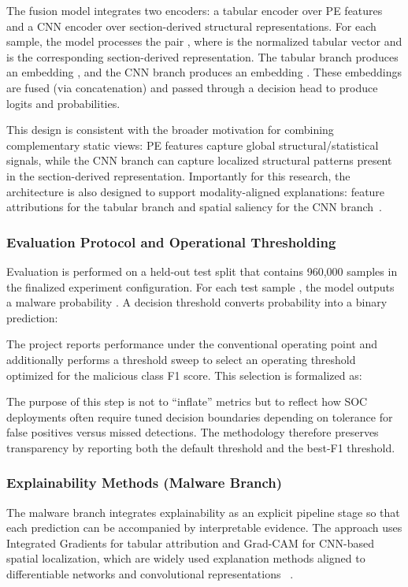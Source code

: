 \documentclass[conference]{IEEEtran}
\begin{document}
The fusion model integrates two encoders: a tabular encoder over PE features and a CNN encoder over section-derived structural representations. For each sample, the model processes the pair , where is the normalized tabular vector and is the corresponding section-derived representation. The tabular branch produces an embedding , and the CNN branch produces an embedding . These embeddings are fused (via concatenation) and passed through a decision head to produce logits and probabilities.

This design is consistent with the broader motivation for combining complementary static views: PE features capture global structural/statistical signals, while the CNN branch can capture localized structural patterns present in the section-derived representation. Importantly for this research, the architecture is also designed to support modality-aligned explanations: feature attributions for the tabular branch and spatial saliency for the CNN branch~\cite{SCDVPB2017}\cite{MAQ2017}.

\subsubsection{Evaluation Protocol and Operational Thresholding}

Evaluation is performed on a held-out test split that contains 960,000 samples in the finalized experiment configuration. For each test sample , the model outputs a malware probability . A decision threshold converts probability into a binary prediction:

The project reports performance under the conventional operating point and additionally performs a threshold sweep to select an operating threshold optimized for the malicious class F1 score. This selection is formalized as:

The purpose of this step is not to “inflate” metrics but to reflect how SOC deployments often require tuned decision boundaries depending on tolerance for false positives versus missed detections. The methodology therefore preserves transparency by reporting both the default threshold and the best-F1 threshold.

\subsubsection{Explainability Methods (Malware Branch)}

The malware branch integrates explainability as an explicit pipeline stage so that each prediction can be accompanied by interpretable evidence. The approach uses Integrated Gradients for tabular attribution and Grad-CAM for CNN-based spatial localization, which are widely used explanation methods aligned to differentiable networks and convolutional representations~\cite{SCDVPB2017} \cite{MAQ2017}.
\end{document}
